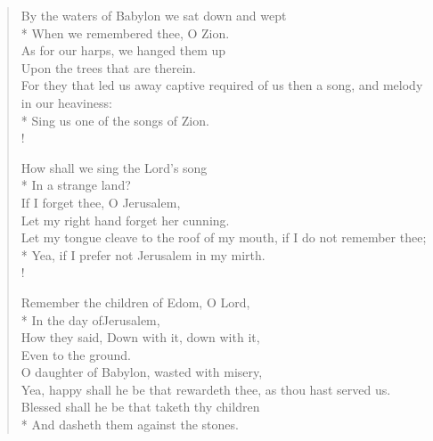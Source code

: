 \documentclass[MAIN]{subfiles}
\begin{document}
\begin{verse}
By the waters of {\sc Babylon} we sat down and wept\\*
\vin When we remembered thee, O {\sc Zion}.\\
As for our harps, we hanged them up\\
\vin Upon the trees that are therein.\\
For they that led us away captive required of us then a song, and melody in our heaviness:\\*
\vin Sing us one of the songs of {\sc Zion}.\\!

How shall we sing the Lord's song\\*
\vin In a strange land?\\
If I forget thee, O {\sc Jerusalem},\\
\vin Let my right hand forget her cunning.\\
Let my tongue cleave to the roof of my mouth, if I do not remember thee;\\*
\vin Yea, if I prefer not {\sc Jerusalem} in my mirth.\\!

Remember the children of Edom, O Lord,\\*
\vin In the day of{\sc Jerusalem},\\
How they said, Down with it, down with it,\\
\vin Even to the ground.\\
O daughter of {\sc Babylon}, wasted with misery,\\
\vin Yea, happy shall he be that rewardeth thee, as thou hast served us.\\
Blessed shall he be that taketh thy children\\*
\vin And dasheth them against the stones.
\end{verse}
\end{document}
